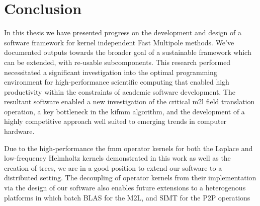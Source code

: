 \chapter{Conclusion}\label{chpt:conclusion}


In this thesis we have presented progress on the development and design of a software framework for kernel independent Fast Multipole methods. We've documented outputs towards the broader goal of a sustainable framework which can be extended, with re-usable subcomponents. This research performed necessitated a significant investigation into the optimal programming environment for high-performance scientific computing that enabled high productivity within the constraints of academic software development. The resultant software enabled a new investigation of the critical \acrshort{m2l} field translation operation, a key bottleneck in the \acrshort{kifmm} algorithm, and the development of a highly competitive approach well suited to emerging trends in computer hardware.

Due to the high-performance the \acrshort{fmm} operator kernels for both the Laplace and low-frequency Helmholtz kernels demonstrated in this work as well as the creation of trees, we are in a good position to extend our software to a distributed setting. The decoupling of operator kernels from their implementation via the design of our software also enables future extensions to a heterogenous platforms in which batch BLAS for the M2L, and SIMT for the P2P operations